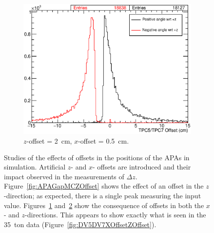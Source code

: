\begin{figure}
\begin{subfigure}[t]{0.49\linewidth}
    \label{fig:APAGapMCXOffsetZOffset}
  \end{subfigure}
  \hfill
  \begin{subfigure}[t]{0.49\linewidth}
    \centering
    \includegraphics[width=\textwidth]{TPC5TPC7MCXOffsetZOffsetAngle.eps}
    \caption{$z$-offset = 2~cm, $x$-offset = 0.5~cm.}
    \label{fig:APAGapMCXOffsetZOffsetAngle}
  \end{subfigure}
  \caption[Studies of the effects of offsets in the positions of the APAs in simulation.]{Studies of the effects of offsets in the positions of the APAs in simulation.  Artificial $z$- and $x$- offsets are introduced and their impact observed in the measurements of $\Delta z$.  Figure~\ref{fig:APAGapMCZOffset} shows the effect of an offset in the $z$-direction; as expected, there is a single peak measuring the input value.  Figures~\ref{fig:APAGapMCXOffsetZOffset} and~\ref{fig:APAGapMCXOffsetZOffsetAngle} show the consequence of offsets in both the $x$- and $z$-directions.  This appears to show exactly what is seen in the 35~ton data (Figure~\ref{fig:DV5DV7XOffsetZOffset}).}
  \label{fig:APAGapMC}
\end{figure}

